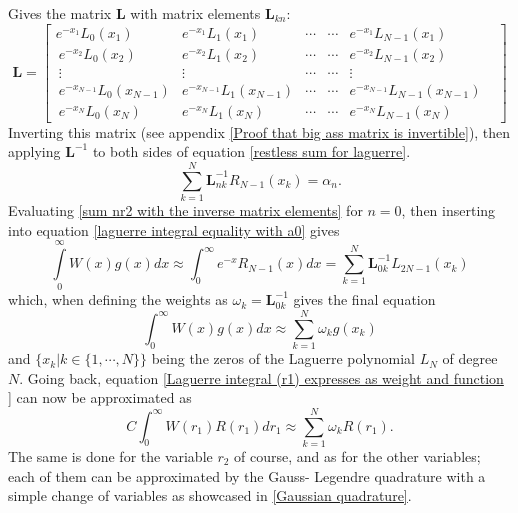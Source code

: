 \documentclass[10pt,a4paper]{article}
\begin{document}
Gives the matrix $\textbf{L}$ with matrix elements $\textbf{L}_{kn}$:
\begin{equation}\label{Big ass matrix}
\textbf{L}=
\begin{bmatrix}
e^{-x_{1}}L_{0}(x_{1}) & e^{-x_{1}} L_{1}( x_{1}) & \cdots &\cdots & e^{-x_{1}} L_{N-1} (x_{1})\\\ e^{-x_{2}} L_{0}( x_{2}) & e^{-x_{2}} L_{1}( x_{2}) & \cdots & \cdots &e^{-x_{2}} L_{N-1}( x_{2})\\\ \vdots & \vdots & \cdots & \cdots & \vdots & \\\ e^{-x_{N-1}} L_{0}( x_{N-1}) & e^{-x_{N-1}} L_{1}( x_{N-1}) & \cdots & \cdots & e^{-x_{N-1}} L_{N-1}( x_{N-1})\\\ e^{-x_{N}} L_{0}( x_{N}) & e^{-x_{N}} L_{1}( x_{N}) & \cdots & \cdots & e^{-x_{N}} L_{N-1}( x_{N})
\end{bmatrix}
\end{equation}
Inverting this matrix (see appendix \ref{Proof that big ass matrix is invertible}), then applying $\textbf{L}^{-1}$ to both sides of equation \ref{restless sum for laguerre}.
\begin{equation}\label{sum nr2 with the inverse matrix elements}
\sum\limits_{k=1}^{N}\textbf{L}_{nk}^{-1}R_{N-1}(x_k) = \alpha_n.
\end{equation}
Evaluating \ref{sum nr2 with the inverse matrix elements} for $n=0$, then inserting into equation \ref{laguerre integral equality with a0} gives
\begin{equation}
\int\limits_0^\infty W(x)g(x)dx \approx \int_{0}^{\infty}e^{-x} R_{N-1}(x)dx = \sum\limits_{k=1}^{N}\textbf{L}_{0k}^{-1} L_{2N-1}(x_k)
\end{equation}
which, when defining the weights as $\omega_k = \textbf{L}_{0k}^{-1}$ gives the final equation
\begin{equation}
\int_{0}^{\infty}W(x)g(x)dx \approx \sum\limits_{k=1}^N \omega_k g(x_k)
\end{equation}
and $\{x_k | k \in \{1,\cdots,N \}\}$ being the zeros of the Laguerre polynomial $L_N$ of degree $N$.
Going back, equation \ref{Laguerre integral (r1) expresses as weight and function } can now be approximated as
\begin{equation}
C\int_{0}^{\infty}W(r_1)R(r_1)dr_1 \approx \sum\limits_{k=1}^N \omega_k R(r_1).
\end{equation}
The same is done for the variable $r_2$ of course, and as for the other variables; each of them can be approximated by the Gauss- Legendre quadrature with a simple change of variables as showcased in \ref{Gaussian quadrature}.
\end{document}
